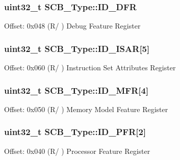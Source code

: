 \subsubsection[{\texorpdfstring{I\+D\+\_\+\+D\+FR}{ID_DFR}}]{ uint32\+\_\+t S\+C\+B\+\_\+\+Type\+::\+I\+D\+\_\+\+D\+FR}\hypertarget{struct_s_c_b___type_a5a8f354519f1ff34593533f095a33679}{}\label{struct_s_c_b___type_a5a8f354519f1ff34593533f095a33679}
Offset\+: 0x048 (R/ ) Debug Feature Register 
\subsubsection[{\texorpdfstring{I\+D\+\_\+\+I\+S\+AR}{ID_ISAR}}]{ uint32\+\_\+t S\+C\+B\+\_\+\+Type\+::\+I\+D\+\_\+\+I\+S\+AR\mbox{[}5\mbox{]}}\hypertarget{struct_s_c_b___type_a468ab7d4458f055dfe2ef420ee6d09d6}{}\label{struct_s_c_b___type_a468ab7d4458f055dfe2ef420ee6d09d6}
Offset\+: 0x060 (R/ ) Instruction Set Attributes Register 
\subsubsection[{\texorpdfstring{I\+D\+\_\+\+M\+FR}{ID_MFR}}]{ uint32\+\_\+t S\+C\+B\+\_\+\+Type\+::\+I\+D\+\_\+\+M\+FR\mbox{[}4\mbox{]}}\hypertarget{struct_s_c_b___type_a1c4c8bc9818ea264c9ceb9b8596c1d05}{}\label{struct_s_c_b___type_a1c4c8bc9818ea264c9ceb9b8596c1d05}
Offset\+: 0x050 (R/ ) Memory Model Feature Register 
\subsubsection[{\texorpdfstring{I\+D\+\_\+\+P\+FR}{ID_PFR}}]{ uint32\+\_\+t S\+C\+B\+\_\+\+Type\+::\+I\+D\+\_\+\+P\+FR\mbox{[}2\mbox{]}}\hypertarget{struct_s_c_b___type_a59c48b5f72df57f333d5827e61d39dd2}{}\label{struct_s_c_b___type_a59c48b5f72df57f333d5827e61d39dd2}
Offset\+: 0x040 (R/ ) Processor Feature Register 
